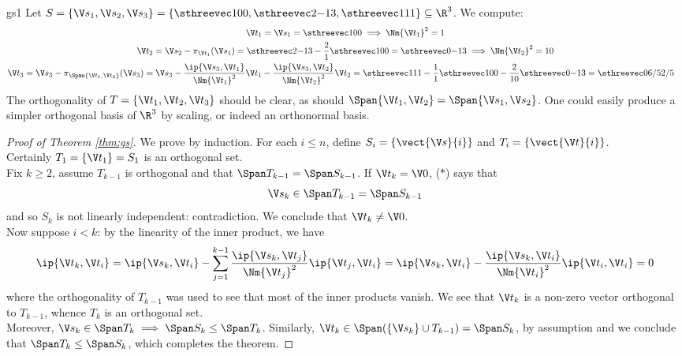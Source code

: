 \begin{example}{}{gs1}
Let $S=\{\vs_1,\vs_2,\vs_3\}=\left\{\sthreevec 100,\sthreevec 2{-1}3,\sthreevec 111\right\}\subseteq\R^3$. We compute:
	\begin{gather*}
\vt_1=\vs_1=\sthreevec 100\implies \Nm{\vt_1}^2=1\\
\vt_2=\vs_2-\pi_{\vt_1}(\vs_1)=\sthreevec 2{-1}3-\frac{2}{1}\sthreevec 100 =\sthreevec 0{-1}3 \implies \Nm{\vt_2}^2=10\\
\begin{aligned}
\vt_3&=\vs_3-\pi_{\Span\{\vt_1,\vt_2\}}(\vs_3) =\vs_3-\frac{\ip{\vs_3,\vt_1}}{\Nm{\vt_1}^2}\vt_1 -\frac{\ip{\vs_3,\vt_2}}{\Nm{\vt_2}^2}\vt_2=\sthreevec 111-\frac{1}{1}\sthreevec 100 -\frac{2}{10}\sthreevec 0{-1}3 =\sthreevec 0{6/5}{2/5}
\end{aligned}
	\end{gather*}
	The orthogonality of $T=\{\vt_1,\vt_2,\vt_3\}$ should be clear, as should $\Span\{\vt_1,\vt_2\}=\Span\{\vs_1,\vs_2\}$. One could easily produce a simpler orthogonal basis of $\R^3$ by scaling, or indeed an orthonormal basis.
\end{example}


\begin{proof}[Proof of Theorem \ref{thm:gs}]
We prove by induction. For each $i\le n$, define $S_i=\{\vect{\vs}{i}\}$ and $T_i=\{\vect{\vt}{i}\}$.\\[5pt]
Certainly $T_1=\{\vt_1\}=S_1$ is an orthogonal set.\\[5pt]
Fix $k\ge 2$, assume $T_{k-1}$ is orthogonal and that $\Span T_{k-1}=\Span S_{k-1}$. If $\vt_k=\V0$, ($\ast$) says that
\[\vs_k\in\Span T_{k-1}=\Span S_{k-1}\]
and so $S_k$ is not linearly independent: contradiction. We conclude that $\vt_k\neq\V0$.\\
Now suppose $i<k$: by the linearity of the inner product, we have
\[\ip{\vt_k,\vt_i}=\ip{\vs_k,\vt_i} -\sum_{j=1}^{k-1}\frac{\ip{\vs_k,\vt_j}}{\Nm{\vt_j}^2}\ip{\vt_j,\vt_i}
=\ip{\vs_k,\vt_i} -\frac{\ip{\vs_k,\vt_i}}{\Nm{\vt_i}^2}\ip{\vt_i,\vt_i} =0\]
where the orthogonality of $T_{k-1}$ was used to see that most of the inner products vanish. We see that $\vt_k$ is a non-zero vector orthogonal to $T_{k-1}$, whence $T_k$ is an orthogonal set.\\[5pt]
Moreover, $\vs_k\in\Span T_k\implies \Span S_k\le\Span T_k$. Similarly, $\vt_k\in\Span(\{\vs_k\}\cup T_{k-1})=\Span S_k$, by assumption and we conclude that $\Span T_k\le\Span S_k$, which completes the theorem.
\end{proof}


